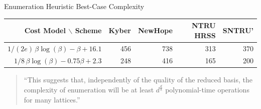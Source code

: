 \documentclass[xcolor=table,10pt,aspectratio=169]{beamer}
\def\enumworstfit{\(1/(2e)\, \beta \log(\beta) - \beta + 16.1\)}
\def\enumavgfit{\(1/8\,\beta \log(\beta) - 0.75\beta + 2.3\)}
\def\rogr{\rowcolor{gray!20}}
\begin{document}
\begin{frame}[label={sec:orgb41408f}]{Enumeration Heuristic Best-Case Complexity}
\begin{center}
\small{
\begin{tabular}{rrrrr}
\textbf{Cost Model} $\backslash$    \textbf{Scheme} & \textbf{Kyber} & \textbf{NewHope} & \textbf{NTRU HRSS} & \textbf{SNTRU'}\\
\hline
\enumworstfit & 456 & 738 & 313 & 370\\
\rogr \enumavgfit & 248 & 416 & 165 & 200\\
\end{tabular}
}
\end{center}

\begin{quote}
“This suggests that, independently of the quality of the reduced basis, the complexity of enumeration will be at least \(d^\frac{d}{8}\) polynomial-time operations for many lattices.”
\phantom{foo}
\end{quote}
\end{frame}
\end{document}
